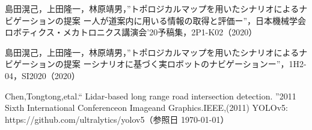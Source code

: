 \documentclass[10pt]{jarticle}
\begin{document}
    
    
    \vspace{5truemm}
    {\footnotesize
        \begin{thebibliography}{5}
            
             島田滉己，上田隆一，林原靖男，”トポロジカルマップを用いたシナリオによるナビゲーションの提案 ー人が道案内に用いる情報の取得と評価ー”，日本機械学会ロボティクス・メカトロニクス講演会'20予稿集，2P1-K02（2020）
            
             島田滉己，上田隆一，林原靖男，”トポロジカルマップを用いたシナリオによるナビゲーションの提案 ーシナリオに基づく実ロボットのナビゲーションー”，1H2-04，SI2020（2020）

             Chen,Tongtong,etal.“ Lidar-based long range road intersection detection. ”2011 Sixth International Conferenceon Imageand Graphics.IEEE,(2011)
             YOLOv5: https://github.com/ultralytics/yolov5（参照日 \today）
            
        \end{thebibliography}
    }
    \normalsize
    
\end{document}
